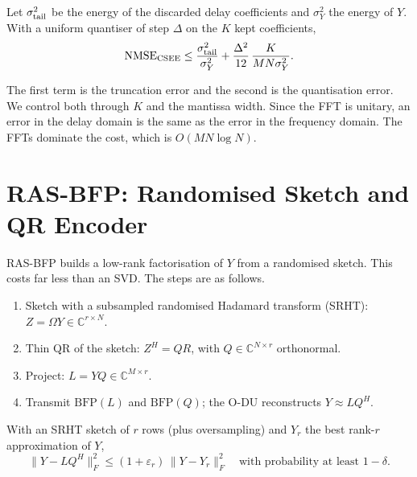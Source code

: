 \begin{theorem}
Let $\sigma^2_{\rm tail}$ be the energy of the discarded delay coefficients and $\sigma_Y^2$ the energy of $Y$. With a uniform quantiser of step $\Delta$ on the $K$ kept coefficients,
\begin{equation}
  \mathrm{NMSE}_{\rm CSEE} \le \frac{\sigma^2_{\rm tail}}{\sigma^2_Y} + \frac{\Delta^2}{12}\,\frac{K}{MN\sigma_Y^2}.
\end{equation}
\end{theorem}
The first term is the truncation error and the second is the quantisation error. We control both through $K$ and the mantissa width. Since the FFT is unitary, an error in the delay domain is the same as the error in the frequency domain. The FFTs dominate the cost, which is $O(MN\log N)$.

\section{RAS-BFP: Randomised Sketch and QR Encoder}
\label{sec:rasbfp}

RAS-BFP builds a low-rank factorisation of $Y$ from a randomised sketch. This costs far less than an SVD. The steps are as follows.
\begin{enumerate}
  \item Sketch with a subsampled randomised Hadamard transform (SRHT): $Z = \Omega Y \in \mathbb{C}^{r\times N}$.
  \item Thin QR of the sketch: $Z^H = QR$, with $Q \in \mathbb{C}^{N\times r}$ orthonormal.
  \item Project: $L = YQ \in \mathbb{C}^{M\times r}$.
  \item Transmit $\mathrm{BFP}(L)$ and $\mathrm{BFP}(Q)$; the O-DU reconstructs $Y \approx LQ^H$.
\end{enumerate}

\begin{theorem}
With an SRHT sketch of $r$ rows (plus oversampling) and $Y_r$ the best rank-$r$ approximation of $Y$,
\begin{equation}
  \|Y - LQ^H\|_F^2 \le (1+\varepsilon_r)\,\|Y - Y_r\|_F^2 \quad\text{with probability at least } 1-\delta.
\end{equation}
\end{theorem}

